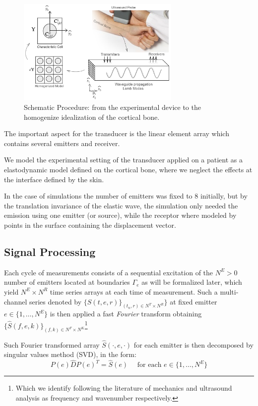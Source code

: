 \begin{figure}[!h]
	\centering
	\includegraphics[width=0.7\textwidth]{images/ImgExt/SchematicPropagation.png}
	\caption{Schematic Procedure: from the experimental device to the homogenize idealization of the cortical bone.}
	\label{SchematicProp&Hom}
\end{figure} 

The important aspect for the transducer is the linear element array which contains several emitters and receiver. 

We model the experimental setting of the transducer applied on a patient as a elastodynamic model defined on the cortical bone, where we neglect the effects at the interface defined by the skin. 

In the case of simulations the number of emitters was fixed to 8 initially, but by the translation invariance of the elastic wave, the simulation only needed the emission using one emitter (or source), while the receptor where modeled by points in the surface containing the displacement vector.

\subsection{Signal Processing}
Each cycle of measurements consists of a sequential excitation of the $N^E > 0$ number of emitters located at boundaries $\Gamma_{e}$ as will be formalized later, which yield $N^E \times N^R$ time series arrays at each time of measurement.
Such a multi-channel series denoted by $\{ S(t,e,r) \}_{(t_n,r) \in N^T\times N^R}\}$ at fixed emitter $e \in \{1, \dots, N^E\}$ is then applied a fast \textit{Fourier} transform obtaining $\{ \hat{S}(f,e,k) \}_{(f,k) \in N^F\times N^K}$\footnote{Which we identify following the literature of mechanics and ultrasound analysis as frequency and wavenumber respectively.}

Such Fourier transformed array $\hat{S}(\cdot, e, \cdot)$ for each emitter is then decomposed by singular values method (SVD), in the form:
\begin{equation*}
    P(e) \hat{D} P(e)^T = \hat{S}(e) \quad \text{ for each } e \in \{1, \dots, N^E \}
\end{equation*}

